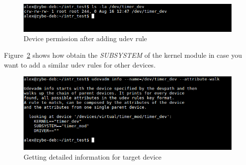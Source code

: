 \begin{figure}[ht]
    \centering
    \includegraphics[width=1.0\textwidth,height=1.0\textheight,keepaspectratio]{figures/device_permission.png}
    \caption{Device permission after adding udev rule}
    \label{fig:file-permission}
\end{figure}

Figure~\ref{fig:device-info} shows how obtain the \emph{SUBSYSTEM} of the kernel module in case you want to add a similar udev rules for other devices.
\begin{figure}[ht]
    \centering
    \includegraphics[width=1.0\textwidth,height=1.0\textheight,keepaspectratio]{figures/device_info.png}
    \caption{Getting detailed information for target device}
    \label{fig:device-info}
\end{figure}
